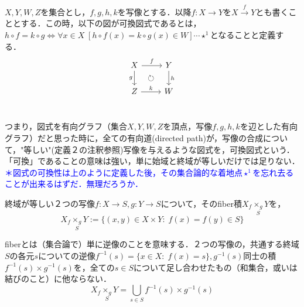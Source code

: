 \documentclass[uplatex, 12pt, a4paper, dvipdfmx]{jsarticle}
\begin{document}
\begin{shadebox}\begin{definition}[写像の可換図式]$X,Y,W,Z$を集合とし，$f,g,h,k$を写像とする．以降$f:X\longrightarrow Y$を$X\xrightarrow{f}Y$とも書くこととする．この時，以下の図が可換図式であるとは，$h\circ f=k\circ g \Longleftrightarrow \forall x\in X \; [h\circ f(x)=k\circ g(x) \in W]\cdots\star^1$となることと定義する．
    $$ \begin{tikzcd}
        X \arrow[r, "f"] \arrow[d, "g"'] \arrow[dr, phantom, "\circlearrowright"] &  Y \arrow[d, "h"] \\
            Z \arrow[r, "k"] &    W \\
    \end{tikzcd} $$
\end{definition}\end{shadebox}
つまり，図式を有向グラフ（集合$X,Y,W,Z$を頂点，写像$f,g,h,k$を辺とした有向グラフ）だと思った時に，全ての有向道(directed path)が，写像の合成について，"等しい"(定義２の注釈参照)写像を与えるような図式を，可換図式という．「可換」であることの意味は強い，単に始域と終域が等しいだけでは足りない．\\
\textcolor{blue}{＊図式の可換性は上のように定義した後，その集合論的な着地点$\star^1$を忘れ去ることが出来るはずだ．無理だろうか．}
\begin{shadebox}\begin{definition}[fiber積]終域が等しい２つの写像$f:X\longrightarrow S, g:Y\longrightarrow S$について，その\rm{fiber積}$X_f\underset{S}{\times_g}Y$を，$$X_f\underset{S}{\times_g}Y:=\{ (x,y)\in X\times Y:\; f(x)=f(y)\in S \}$$  \end{definition}\end{shadebox}
fiberとは（集合論で）単に逆像のことを意味する．２つの写像の，共通する終域$S$の各元$s$についての逆像$f^{-1}(s)=\{ x\in X:\; f(x)=s \},g^{-1}(s)$同士の積$f^{-1}(s)\times g^{-1}(s)$を，全ての$s\in S$について足し合わせたもの（和集合，或いは結びのこと）に他ならない．$$X_f\underset{S}{\times_g}Y=\bigcup_{s\in S}f^{-1}(s)\times g^{-1}(s)$$
\end{document}

